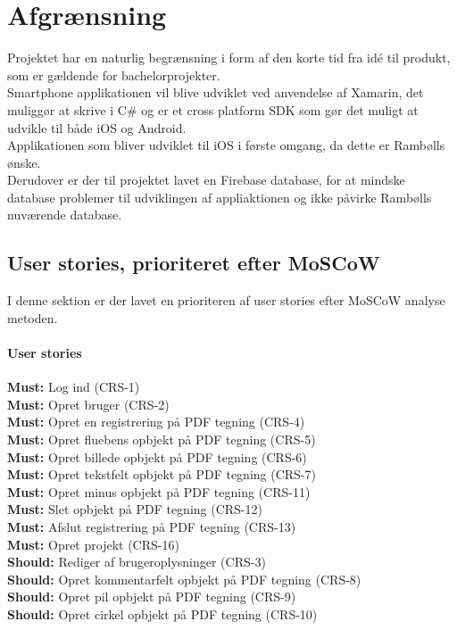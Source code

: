 \chapter{Afgrænsning}
Projektet har en naturlig begrænsning i form af den korte tid fra idé til produkt, som er gældende for bachelorprojekter.\\
Smartphone applikationen vil blive udviklet ved anvendelse af Xamarin, det muliggør at skrive i C\# og er et cross platform SDK som gør det muligt at udvikle til både iOS og Android. \\
Applikationen som bliver udviklet til iOS i første omgang, da dette er Rambølls ønske. \\
Derudover er der til projektet lavet en Firebase database, for at mindske database problemer til udviklingen af appliaktionen og ikke påvirke Rambølls nuværende database. \\

\section{User stories, prioriteret efter MoSCoW} \label{sec:MoSCoW}
I denne sektion er der lavet en prioriteren af user stories efter MoSCoW analyse metoden.

\subsubsection{User stories}
\textbf{Must:} Log ind (CRS-1) \\
\textbf{Must:} Opret bruger (CRS-2) \\
\textbf{Must:} Opret en registrering på PDF tegning (CRS-4) \\
\textbf{Must:} Opret fluebens opbjekt på PDF tegning (CRS-5) \\
\textbf{Must:} Opret billede opbjekt på PDF tegning (CRS-6) \\
\textbf{Must:} Opret tekstfelt opbjekt på PDF tegning (CRS-7) \\
\textbf{Must:} Opret minus opbjekt på PDF tegning (CRS-11) \\
\textbf{Must:} Slet opbjekt på PDF tegning (CRS-12) \\
\textbf{Must:} Afslut registrering på PDF tegning (CRS-13) \\
\textbf{Must:} Opret projekt (CRS-16) \\

\textbf{Should:} Rediger af brugeroplysninger (CRS-3) \\
\textbf{Should:} Opret kommentarfelt opbjekt på PDF tegning (CRS-8) \\
\textbf{Should:} Opret pil opbjekt på PDF tegning (CRS-9) \\
\textbf{Should:} Opret cirkel opbjekt på PDF tegning (CRS-10) \\

